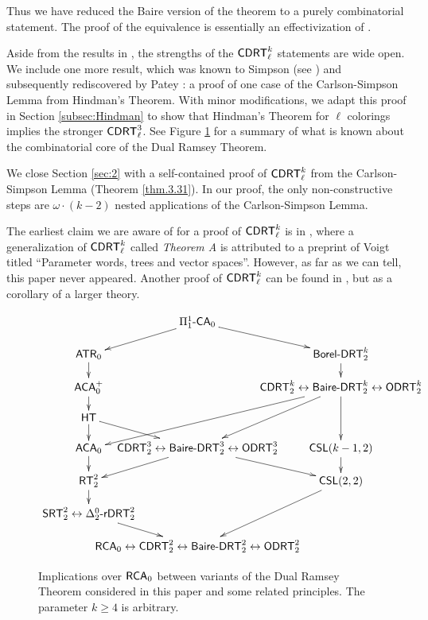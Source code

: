 \documentclass{amsart}
\theoremstyle{definition}
\theoremstyle{remark}
\newcommand{\system}[1]{\mbox{\fontfamily{cmss}\fontshape{n}\fontseries{m}%
    \selectfont#1}}
\newcommand{\RCA}{\system{RCA}\ensuremath{_0}}
\newcommand{\CDRT}{\system{CDRT}}
\begin{document}
Thus we have reduced the Baire version of the theorem to a purely combinatorial 
statement.  The proof of the equivalence
is essentially an effectivization of \cite{pv}.

Aside from the results in \cite{ms}, 
the strengths of the $\CDRT^k_\ell$ statements are wide open. 
We include one more result, which was known to Simpson (see \cite[page 268]{cs})
and subsequently rediscovered by Patey  \cite{patey}:
a proof of one case of the Carlson-Simpson Lemma
 from Hindman's Theorem.  
With minor modifications, we adapt this
proof in Section \ref{subsec:Hindman} to show that Hindman's Theorem for $\ell$ colorings 
implies the stronger $\CDRT^3_{\ell}$. See Figure \ref{fig:1.1}
for a summary of what is known about the combinatorial core of the Dual 
Ramsey Theorem.

We close Section \ref{sec:2} with a self-contained proof of 
$\CDRT^k_{\ell}$ from the Carlson-Simpson Lemma (Theorem \ref{thm.3.31}).  
In our proof, the only non-constructive steps are 
$\omega \cdot (k-2)$ nested applications of the Carlson-Simpson Lemma.
  
The earliest claim we are aware of for a proof of $\CDRT^k_{\ell}$ is
in \cite{pv}, where a generalization of $\CDRT^k_{\ell}$ called \emph{Theorem A} 
is attributed to a preprint of 
Voigt titled ``Parameter words, trees and vector spaces''. However, as far as we can tell, this paper never appeared.  Another proof of $\CDRT^k_{\ell}$ can be 
found in \cite{TodorcevicRamsey}, but as a corollary of a larger theory.


\begin{figure}\label{fig:1.1}\caption{Implications over $\RCA$ between variants of the Dual Ramsey Theorem considered in this paper and some related principles. 
The parameter $k \geq 4$ is arbitrary.}
\[
\xymatrix @C=-3.5pc@R=1pc{
& \Pi^1_1\text{-}\mathsf{CA}_0 \ar[dr] \ar[dl]\\
\mathsf{ATR}_0 \ar[d] & & \mathsf{Borel}\text{-}\mathsf{DRT}^k_2 \ar[d]\\
\mathsf{ACA}^+_0 \ar[d] & & \mathsf{CDRT}^k_2 \leftrightarrow \mathsf{Baire}\text{-}\mathsf{DRT}^k_2 \leftrightarrow  \mathsf{ODRT}^k_2 \ar[dd] \ar[ddl] \ar[ddll] \\ 
\mathsf{HT} \ar[dr] \ar[d]\\
\mathsf{ACA}_0 \ar[d] & \mathsf{CDRT}^3_2 \leftrightarrow \mathsf{Baire}\text{-}\mathsf{DRT}^3_2 \leftrightarrow  \mathsf{ODRT}^3_2 \ar[dl] \ar[dr] & \mathsf{CSL}(k-1,2) \ar[d]\\
\mathsf{RT}^2_2 \ar[d] & & \mathsf{CSL}(2,2) \ar[ddl] \\
\mathsf{SRT}^2_2 \leftrightarrow \Delta^0_2\text{-}\mathsf{rDRT}^2_2 \ar[dr]\\
& \mathsf{RCA}_0 \leftrightarrow \mathsf{CDRT}^2_2 \leftrightarrow \mathsf{Baire}\text{-}\mathsf{DRT}^2_2 \leftrightarrow  \mathsf{ODRT}^2_2
}
\]
 \end{figure}
\end{document}
